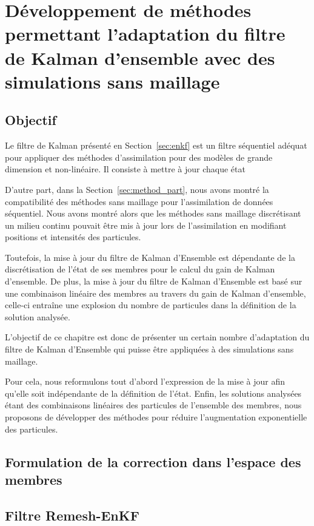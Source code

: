 
\section{Développement de méthodes permettant l'adaptation du filtre de Kalman d'ensemble avec des simulations sans maillage}

\subsection{Objectif}
Le filtre de Kalman présenté en Section~\ref*{sec:enkf} est un filtre séquentiel adéquat pour appliquer des méthodes d'assimilation pour des modèles de grande dimension et non-linéaire. Il consiste à mettre à jour chaque état

D'autre part, dans la Section~\ref{sec:method_part}, nous avons montré la compatibilité des méthodes sans maillage pour l'assimilation de données séquentiel. Nous avons montré alors que les méthodes sans maillage discrétisant un milieu continu pouvait être mis à jour lors de l'assimilation en modifiant positions et intensités des particules.

Toutefois, la mise à jour du filtre de Kalman d'Ensemble est dépendante de la discrétisation de l'état de ses membres pour le calcul du gain de Kalman d'ensemble. De plus, la mise à jour du filtre de Kalman d'Ensemble est basé sur une combinaison linéaire des membres au travers du gain de Kalman d'ensemble, celle-ci entraîne une explosion du nombre de particules dans la définition de la solution analysée.

L'objectif de ce chapitre est donc de présenter un certain nombre d'adaptation du filtre de Kalman d'Ensemble qui puisse être appliquées à des simulations sans maillage.

Pour cela, nous reformulons tout d'abord l'expression de la mise à jour afin qu'elle soit indépendante de la définition de l'état.
Enfin, les solutions analysées étant des combinaisons linéaires des particules de l'ensemble des membres, nous proposons de développer des méthodes pour réduire l'augmentation exponentielle des particules.

\subsection{Formulation de la correction dans l'espace des membres}

\subsection{Filtre Remesh-EnKF}
